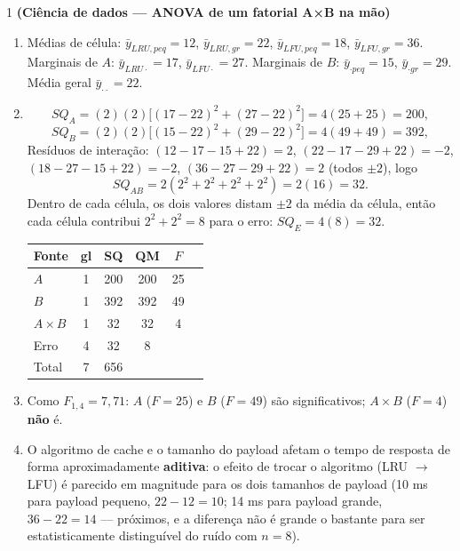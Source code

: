 \documentclass[11pt]{article}
\begin{document}

\begin{questao}{1} \textbf{(Ciência de dados --- ANOVA de um fatorial A×B na mão)}
\end{questao}
\begin{solucao}
\begin{enumerate}[label=(\alph*)]
  \item Médias de célula: $\bar y_{LRU,peq}=12$, $\bar y_{LRU,gr}=22$, $\bar y_{LFU,peq}=18$,
    $\bar y_{LFU,gr}=36$. Marginais de $A$: $\bar y_{LRU\cdot}=17$, $\bar y_{LFU\cdot}=27$.
    Marginais de $B$: $\bar y_{\cdot peq}=15$, $\bar y_{\cdot gr}=29$. Média geral $\bar
    y_{\cdot\cdot}=22$.
  \item
  $$SQ_A = (2)(2)\big[(17-22)^2+(27-22)^2\big] = 4(25+25) = 200,$$
  $$SQ_B = (2)(2)\big[(15-22)^2+(29-22)^2\big] = 4(49+49) = 392,$$
  Resíduos de interação: $(12-17-15+22)=2$, $(22-17-29+22)=-2$, $(18-27-15+22)=-2$,
  $(36-27-29+22)=2$ (todos $\pm2$), logo
  $$SQ_{AB} = 2(2^2+2^2+2^2+2^2) = 2(16) = 32.$$
  Dentro de cada célula, os dois valores distam $\pm2$ da média da célula, então cada célula
  contribui $2^2+2^2=8$ para o erro: $SQ_E = 4(8) = 32$.

  \begin{center}
  \begin{tabular}{lccccc}
  \toprule
  Fonte & gl & SQ & QM & $F$ \\ \midrule
  $A$ & 1 & 200 & 200 & 25 \\
  $B$ & 1 & 392 & 392 & 49 \\
  $A{\times}B$ & 1 & 32 & 32 & 4 \\
  Erro & 4 & 32 & 8 & \\
  Total & 7 & 656 & & \\ \bottomrule
  \end{tabular}
  \end{center}
  \item Como $F_{1,4}=7{,}71$: $A$ ($F=25$) e $B$ ($F=49$) são significativos; $A{\times}B$
    ($F=4$) \textbf{não} é.
  \item O algoritmo de cache e o tamanho do payload afetam o tempo de resposta de forma
    aproximadamente \textbf{aditiva}: o efeito de trocar o algoritmo (LRU $\to$ LFU) é parecido
    em magnitude para os dois tamanhos de payload (10 ms para payload pequeno, $22-12=10$; 14 ms
    para payload grande, $36-22=14$ --- próximos, e a diferença não é grande o bastante para ser
    estatisticamente distinguível do ruído com $n=8$).
\end{enumerate}
\end{solucao}
\end{document}
